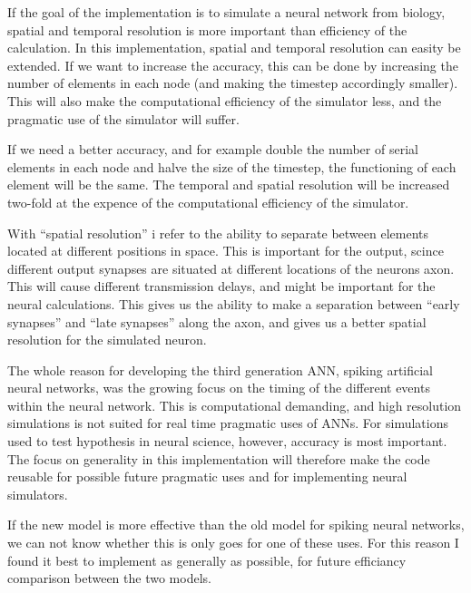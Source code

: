 If the goal of the implementation is to simulate a neural network from biology, spatial and temporal resolution is more important than efficiency of the calculation.
In this implementation, spatial and temporal resolution can easity be extended.
If we want to increase the accuracy, this can be done by increasing the number of elements in each node (and making the timestep accordingly smaller).
This will also make the computational efficiency of the simulator less, and the pragmatic use of the simulator will suffer.

If we need a better accuracy, and for example double the number of serial elements in each node and halve the size of the timestep, the functioning of each element will be the same.
The temporal and spatial resolution will be increased two-fold at the expence of the computational efficiency of the simulator.

With ``spatial resolution'' i refer to the ability to separate between elements located at different positions in space.
This is important for the output, scince different output synapses are situated at different locations of the neurons axon.
This will cause different transmission delays, and might be important for the neural calculations.
This gives us the ability to make a separation between ``early synapses'' and ``late synapses'' along the axon, and gives us a better spatial resolution for the simulated neuron.

The whole reason for developing the third generation ANN, spiking artificial neural networks, was the growing focus on the timing of the different events within the neural network.
This is computational demanding, and high resolution simulations is not suited for real time pragmatic uses of ANNs. For simulations used to test hypothesis in neural science, however, accuracy is most important.
The focus on generality in this implementation will therefore make the code reusable for possible future pragmatic uses and for implementing neural simulators.

If the new model is more effective than the old model for spiking neural networks, we can not know whether this is only goes for one of these uses. 
For this reason I found it best to implement as generally as possible, for future efficiancy comparison between the two models.

